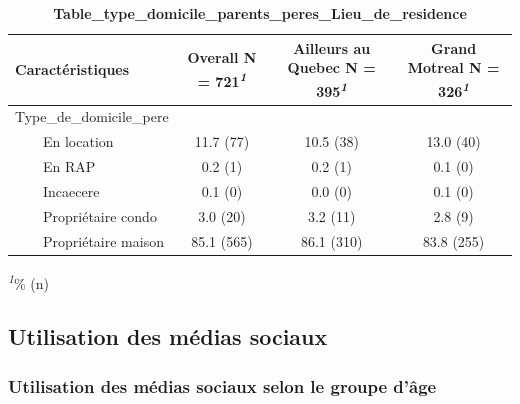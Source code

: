 \documentclass[
]{article}
\begin{document}
\newpage
\begin{table}[!t]
\caption{\label{tab:unnamed-chunk-40}\textbf{Table\_type\_domicile\_parents\_peres\_Lieu\_de\_residence}} 
\fontsize{12.0pt}{14.4pt}\selectfont
\begin{tabular*}{\linewidth}{@{\extracolsep{\fill}}lccc}
\toprule
\textbf{Caractéristiques} & \textbf{Overall}  N = 721\textsuperscript{\textit{1}} & \textbf{Ailleurs au Quebec}  N = 395\textsuperscript{\textit{1}} & \textbf{Grand Motreal}  N = 326\textsuperscript{\textit{1}} \\ 
\midrule\addlinespace[2.5pt]
Type\_de\_domicile\_pere &  &  &  \\ 
    En location & 11.7 (77) & 10.5 (38) & 13.0 (40) \\ 
    En RAP & 0.2 (1) & 0.2 (1) & 0.1 (0) \\ 
    Incaecere & 0.1 (0) & 0.0 (0) & 0.1 (0) \\ 
    Propriétaire condo & 3.0 (20) & 3.2 (11) & 2.8 (9) \\ 
    Propriétaire maison & 85.1 (565) & 86.1 (310) & 83.8 (255) \\ 
\bottomrule
\end{tabular*}
\begin{minipage}{\linewidth}
\textsuperscript{\textit{1}}\% (n)\\
\end{minipage}
\end{table}

\vspace{2cm}

\hypertarget{utilisation-des-muxe9dias-sociaux}{%
\subsection{Utilisation des médias
sociaux}\label{utilisation-des-muxe9dias-sociaux}}

\vspace{1cm}

\hypertarget{utilisation-des-muxe9dias-sociaux-selon-le-groupe-duxe2ge-1}{%
\subsubsection{Utilisation des médias sociaux selon le groupe
d'âge}\label{utilisation-des-muxe9dias-sociaux-selon-le-groupe-duxe2ge-1}}
\end{document}
